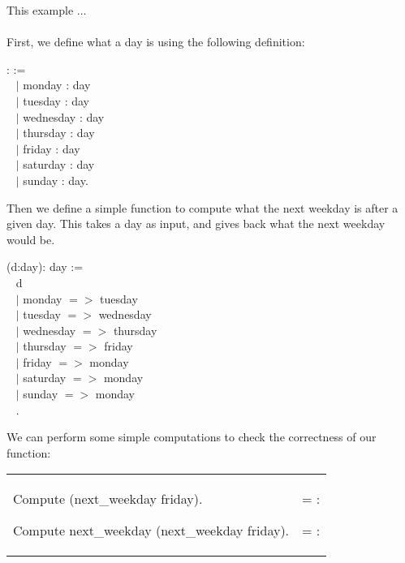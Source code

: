 
This example ...
\\~\\

\noindent
First, we define what a day is using the following definition:

\begin{code}
\Inductive {}: \Type :=		\\ \-\ \quad
  $\mid$ monday : day			\\ \-\ \quad
  $\mid$ tuesday : day			\\ \-\ \quad
  $\mid$ wednesday : day			\\ \-\ \quad
  $\mid$ thursday : day			\\ \-\ \quad
  $\mid$ friday : day				\\ \-\ \quad
  $\mid$ saturday : day			\\ \-\ \quad
  $\mid$ sunday : day.
\end{code}

\noindent
Then we define a simple function to compute what the next weekday is after a given day. 
This takes a day as input, and gives back what the next weekday would be.

\begin{code}
\Definition {} (d:day): day :=		\\ \-\ \quad
  \match d \with								\\ \-\ \qquad
   $\mid$ monday $=>$ tuesday					\\ \-\ \qquad
   $\mid$ tuesday $=>$ wednesday				\\ \-\ \qquad
   $\mid$ wednesday $=>$ thursday				\\ \-\ \qquad
   $\mid$ thursday $=>$ friday					\\ \-\ \qquad
   $\mid$ friday $=>$ monday					\\ \-\ \qquad
   $\mid$ saturday $=>$ monday				\\ \-\ \qquad
   $\mid$ sunday $=>$ monday					\\ \-\ \quad
  \End.
\end{code}

\noindent
We can perform some simple computations to check the correctness of our function:

\hspace{-1cm}
\begin{tabular}{p{9cm} p{7cm}}
\begin{code} 	Compute (next\_weekday friday).	\end{code}
\begin{code}	Compute next\_weekday (next\_weekday friday).	\end{code}	
&	
\begin{msg}	     = \nm{monday}     : \nm{day}	\end{msg}
\begin{msg}	     = \nm{tuesday}     : \nm{day}		\end{msg}
\end{tabular}

